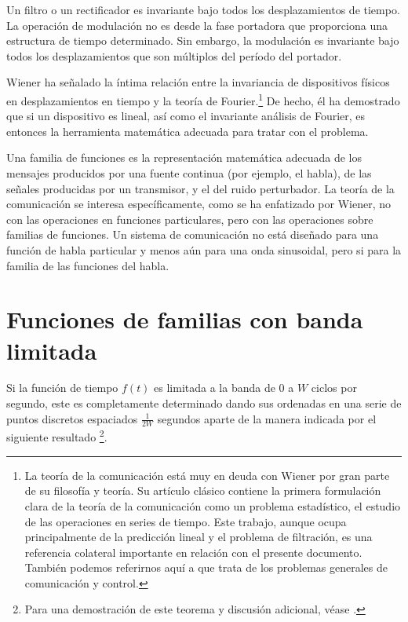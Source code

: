 Un filtro o un rectificador es invariante bajo todos los
desplazamientos de tiempo. La operaci\'on de modulaci\'on no es desde
la fase portadora que proporciona una estructura de tiempo
determinado. Sin embargo, la modulaci\'on es invariante bajo todos los
desplazamientos que son m\'ultiplos del per\'iodo del portador.

Wiener ha se\~nalado la \'intima relaci\'on entre la invariancia de
dispositivos f\'isicos en desplazamientos en tiempo y la teor\'ia de
Fourier.\footnote{La teor\'ia de la comunicaci\'on est\'a muy en deuda
  con Wiener por gran parte de su filosof\'ia y teor\'ia. Su
  art\'iculo cl\'asico \citep{wiener2} contiene la primera
  formulaci\'on clara de la teor\'ia de la comunicaci\'on como un
  problema estad\'istico, el estudio de las operaciones en series de
  tiempo. Este trabajo, aunque ocupa principalmente de la predicci\'on
  lineal y el problema de filtraci\'on, es una referencia colateral
  importante en relaci\'on con el presente documento. Tambi\'en
  podemos referirnos aqu\'i a \citet{wiener3} que trata de los
  problemas generales de comunicaci\'on y control.} De hecho, \'el ha
demostrado que si un dispositivo es lineal, as\'i como el invariante
an\'alisis de Fourier, es entonces la herramienta matem\'atica
adecuada para tratar con el problema.

Una familia de funciones es la representaci\'on matem\'atica adecuada
de los mensajes producidos por una fuente continua (por ejemplo, el
habla), de las se\~nales producidas por un transmisor, y el del ruido
perturbador. La teor\'ia de la comunicaci\'on se interesa
espec\'ificamente, como se ha enfatizado por Wiener, no con las
operaciones en funciones particulares, pero con las operaciones sobre
familias de funciones. Un sistema de comunicaci\'on no est\'a
dise\~nado para una funci\'on de habla particular y menos a\'un para
una onda sinusoidal, pero si para la familia de las funciones del
habla.

\clearpage

\chapter{Funciones de familias con banda limitada}
\label{sec:19}

Si la funci\'on de tiempo $f(t)$ es limitada a la banda de 0 a $W$
ciclos por segundo, este es completamente determinado dando sus
ordenadas en una serie de puntos discretos espaciados $\frac{1}{2W}$
segundos aparte de la manera indicada por el siguiente
resultado \footnote{Para una demostraci\'on de este teorema y
  discusi\'on adicional, v\'ease \citep{shannon}.}.

